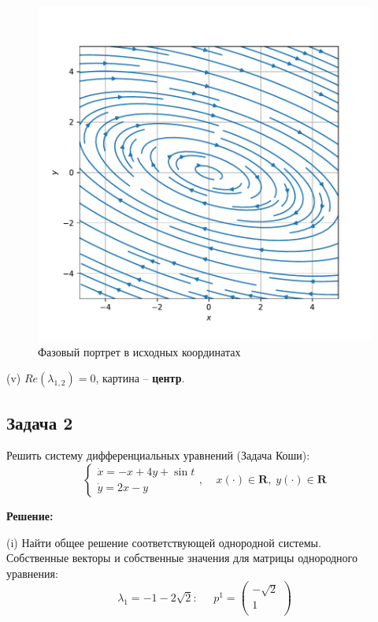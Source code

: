\documentclass[a4paper, 12pt]{article}
\begin{document}
\begin{figure}[H]
	\centering
	\includegraphics[scale=0.7]{3a1_1}
	\caption{Фазовый портрет в исходных координатах}
	\label{im:3a1_1}
\end{figure}

(v) $Re(\lambda_{1,2})=0$, картина -- \textbf{центр}.






	\subsection* {Задача 2}
 Решить систему дифференциальных уравнений (Задача Коши): 
\begin{equation}
\left\{
\begin{array}{lr}
\dot{x} = -x+4y+\sin{t}\\
\dot{y} = 2x-y
\end{array}
\right.
, \;\;\;\; x(\cdot)\in \textbf{R},\; y(\cdot)\in \textbf{R}
\label{eq:30}
\end{equation}

\textbf{Решение:} \par


(i) Найти общее решение соответствующей однородной системы.\\

Собственные векторы и собственные значения для матрицы однородного уравнения:
\[\lambda_1 = -1-2\sqrt 2 :\;\;\;\;\; p^1=
\left(
\begin{array}{cc}
-\sqrt 2\\
1\\
\end{array}
\right)  
\]
\end{document}
